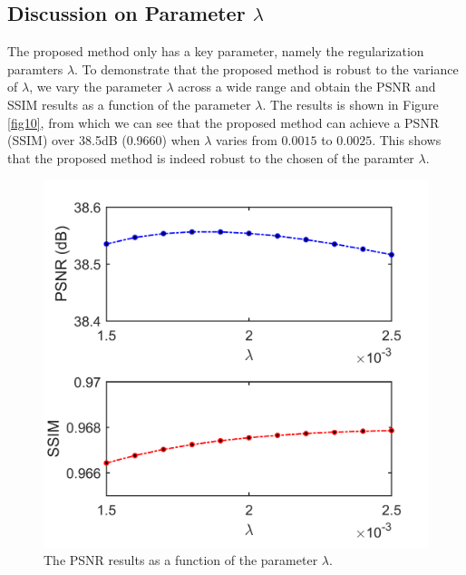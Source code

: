 \documentclass[10pt,twocolumn,letterpaper]{article}
\begin{document}
\subsection{Discussion on Parameter $\lambda$}
The proposed method only has a key parameter, namely the regularization paramters $\lambda$. To demonstrate that the proposed method is robust to the variance of $\lambda$, we vary the parameter $\lambda$ across a wide range and obtain the PSNR and SSIM results as a function of the parameter $\lambda$. The results is shown in Figure \ref{fig10}, from which we can see that the proposed method can achieve a PSNR (SSIM) over 38.5dB (0.9660) when $\lambda$ varies from $0.0015$ to $0.0025$. This shows that the proposed method is indeed robust to the chosen of the paramter $\lambda$.

\begin{figure}
\includegraphics[width=1\linewidth]{images/param.png}
\caption{The PSNR results as a function of the parameter $\lambda$.}
\label{fig6}
\end{figure}
\end{document}
